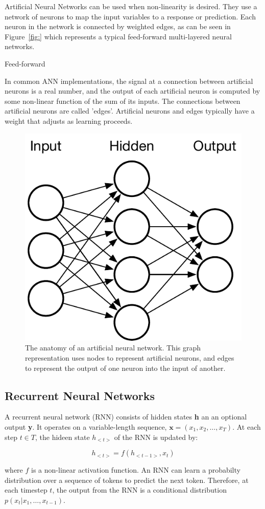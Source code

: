 Artificial Neural Networks can be used when non-linearity is desired. They use a network of neurons to map the input variables to a response or prediction. Each neuron in the network is connected by weighted edges, as can be seen in Figure~\ref{fig:} which represents a typical feed-forward multi-layered neural networks.

Feed-forward

In common ANN implementations, the signal at a connection between artificial neurons is a real number, and the output of each artificial neuron is computed by some non-linear function of the sum of its inputs. The connections between artificial neurons are called 'edges'. Artificial neurons and edges typically have a weight that adjusts as learning proceeds.

\begin{figure}
  \centering
  \includegraphics[width=.45\columnwidth]{img/artificial-neural-network}%
  \caption[Structure of an artificial neural network]{%
    The anatomy of an artificial neural network. This graph representation uses nodes to represent artificial neurons, and edges to represent the output of one neuron into the input of another.%
  }%
  \label{fig:artificial-neural-network}
\end{figure}


\subsection{Recurrent Neural Networks}

A recurrent neural network (RNN) consists of hidden states \textbf{h} an an optional output \textbf{y}. It operates on a variable-length sequence, $\bm{x} = \left( x_1, x_2, \ldots, x_T \right)$. At each step $t \in T$, the hideen state $h_{<t>}$ of the RNN is updated by:

\[ h_{<t>} = f\left( h_{<t-1>}, x_t \right) \]

where $f$ is a non-linear activation function. An RNN can learn a probabilty distribution over a sequence of tokens to predict the next token. Therefore, at each timestep $t$, the output from the RNN is a conditional distribution $p\left( x_t | x_1, \ldots, x_{t-1} \right)$.

